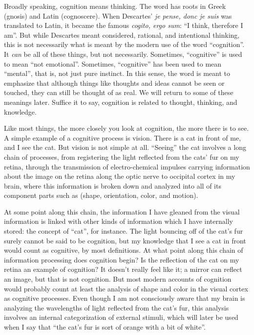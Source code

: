 \documentclass[
]{article}
\begin{document}
Broadly speaking, cognition means thinking. The word has roots in Greek (gnosis) and Latin (cognoscere). When Descartes' \emph{je pense, donc je suis} \citeyearpar{descartes1968discourse} was translated to Latin, it became the famous \emph{cogito, ergo sum}: ``I think, therefore I am''. But while Descartes meant considered, rational, and intentional thinking, this is not necessarily what is meant by the modern use of the word ``cognition''. It \emph{can} be all of these things, but not necessarily. Sometimes, ``cognitive'' is used to mean ``not emotional''. Sometimes, ``cognitive'' has been used to mean ``mental'', that is, not just pure instinct. In this sense, the word is meant to emphasize that although things like thoughts and ideas cannot be seen or touched, they can still be thought of as real. We will return to some of these meanings later. Suffice it to say, cognition is related to thought, thinking, and knowledge.

Like most things, the more closely you look at cognition, the more there is to see. A simple example of a cognitive process is vision. There is a cat in front of me, and I see the cat. But vision is not simple at all. ``Seeing'' the cat involves a long chain of processes, from registering the light reflected from the cats' fur on my retina, through the transmission of electro-chemical impulses carrying information about the image on the retina along the optic nerve to occipital cortex in my brain, where this information is broken down and analyzed into all of its component parts such as (shape, orientation, color, and motion).

At some point along this chain, the information I have gleaned from the visual information is linked with other kinds of information which I have internally stored: the concept of ``cat'', for instance. The light bouncing off of the cat's fur surely cannot be said to be cognition, but my knowledge that I see a cat in front would count as cognitive, by most definitions. At what point along this chain of information processing does cognition begin? Is the reflection of the cat on my retina an example of cognition? It doesn't really feel like it; a mirror can reflect an image, but that is not cognition. But most modern accounts of cognition would probably count at least the analysis of shape and color in the visual cortex as cognitive processes. Even though I am not consciously aware that my brain is analyzing the wavelengths of light reflected from the cat's fur, this analysis involves an internal categorization of external stimuli, which will later be used when I say that ``the cat's fur is sort of orange with a bit of white''.
\end{document}
